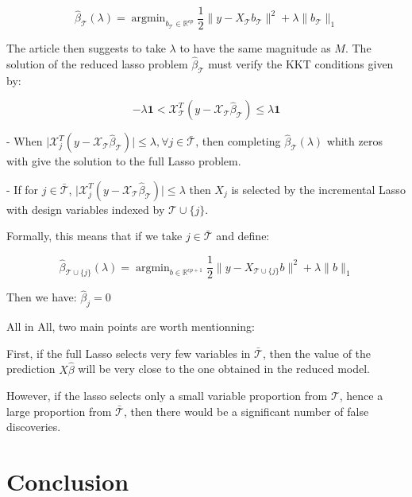 \documentclass[10pt,onecolumn,letterpaper]{article}
\DeclareMathOperator*{\argmin}{argmin}
\begin{document}
$$
\hat{\beta}_{\mathcal{T}}(\lambda) = \argmin_{b_{\mathcal{T}} \in \mathbb{R}^{\epsilon p}}  \frac{1}{2}\lVert y - X_{\mathcal{T}}b_{\mathcal{T}} \rVert^2 + \lambda \lVert b_{\mathcal{T}} \rVert_1 
$$

The article then suggests to take $\lambda$ to have the same magnitude as $M$. The solution of the reduced lasso problem $\hat{\beta}_{\mathcal{T}}$ must verify the KKT conditions given by: 

$$
- \lambda \boldsymbol{1} < \mathcal{X}_{\mathcal{T}}^T(y - \mathcal{X}_{\mathcal{T}} \hat{\beta}_{\mathcal{T}}) \leq \lambda \boldsymbol{1}
$$

- When $\vert \mathcal{X}_{j}^T(y - \mathcal{X}_{\mathcal{T}} \hat{\beta}_{\mathcal{T}}) \vert \leq \lambda, \forall j \in \bar{\mathcal{T}} $, then completing $\hat{\beta}_{\mathcal{T}}(\lambda)$ whith zeros with give the solution to the full Lasso problem. 
\newline 

- If for $ j \in \bar{\mathcal{T}}$, $\vert \mathcal{X}_{j}^T(y - \mathcal{X}_{\mathcal{T}} \hat{\beta}_{\mathcal{T}}) \vert \leq \lambda $ then $X_j$ is selected by the incremental Lasso with design variables indexed by $\mathcal{T} \cup \{j\}$. 

Formally, this means that if we take $j \in \bar{\mathcal{T}}$ and define:

$$
\hat{\beta}_{\mathcal{T} \cup \{j\}}(\lambda) = \argmin_{b \in \mathbb{R}^{\epsilon p + 1}}  \frac{1}{2}\lVert y - X_{\mathcal{T} \cup \{j\}}b \rVert^2 + \lambda \lVert b \rVert_1 
$$

Then we have: $\hat{\beta}_j = 0$
\newline

All in All, two main points are worth mentionning:
\newline

First, if the full Lasso selects very few variables in $\bar{\mathcal{T}}$, then the value of the prediction $X\hat{\beta}$ will be very close to the one obtained in the reduced model.  

However, if the lasso selects only a small variable proportion from $\mathcal{T}$, hence a large proportion from $\bar{\mathcal{T}}$, then there would be a significant number of false discoveries. 

\section{Conclusion}
\end{document}
